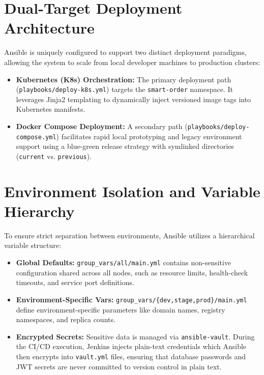 \documentclass[12pt,a4paper]{report}
\begin{document}
\section{Dual-Target Deployment Architecture}
Ansible is uniquely configured to support two distinct deployment paradigms, allowing the system to scale from local developer machines to production clusters:
\begin{itemize}
    \item \textbf{Kubernetes (K8s) Orchestration:} The primary deployment path (\texttt{playbooks/deploy-k8s.yml}) targets the \texttt{smart-order} namespace. It leverages Jinja2 templating to dynamically inject versioned image tags into Kubernetes manifests.
    \item \textbf{Docker Compose Deployment:} A secondary path (\texttt{playbooks/deploy-compose.yml}) facilitates rapid local prototyping and legacy environment support using a blue-green release strategy with symlinked directories (\texttt{current} vs. \texttt{previous}).
\end{itemize}

\section{Environment Isolation and Variable Hierarchy}
To ensure strict separation between environments, Ansible utilizes a hierarchical variable structure:
\begin{itemize}
    \item \textbf{Global Defaults:} \texttt{group\_vars/all/main.yml} contains non-sensitive configuration shared across all nodes, such as resource limits, health-check timeouts, and service port definitions.
    \item \textbf{Environment-Specific Vars:} \texttt{group\_vars/\{dev,stage,prod\}/main.yml} define environment-specific parameters like domain names, registry namespaces, and replica counts.
    \item \textbf{Encrypted Secrets:} Sensitive data is managed via \texttt{ansible-vault}. During the CI/CD execution, Jenkins injects plain-text credentials which Ansible then encrypts into \texttt{vault.yml} files, ensuring that database passwords and JWT secrets are never committed to version control in plain text.
\end{itemize}
\end{document}
